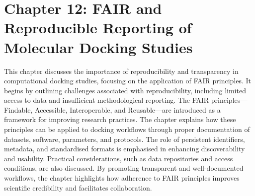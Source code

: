 \documentclass[12pt,a4paper]{article}
\begin{document}
\section*{Chapter 12: FAIR and Reproducible Reporting of Molecular Docking Studies}
This chapter discusses the importance of reproducibility and transparency in computational docking studies, focusing on the application of FAIR principles. It begins by outlining challenges associated with reproducibility, including limited access to data and insufficient methodological reporting. The FAIR principles—Findable, Accessible, Interoperable, and Reusable—are introduced as a framework for improving research practices. The chapter explains how these principles can be applied to docking workflows through proper documentation of datasets, software, parameters, and protocols. The role of persistent identifiers, metadata, and standardised formats is emphasised in enhancing discoverability and usability. Practical considerations, such as data repositories and access conditions, are also discussed. By promoting transparent and well-documented workflows, the chapter highlights how adherence to FAIR principles improves scientific credibility and facilitates collaboration.
\end{document}
